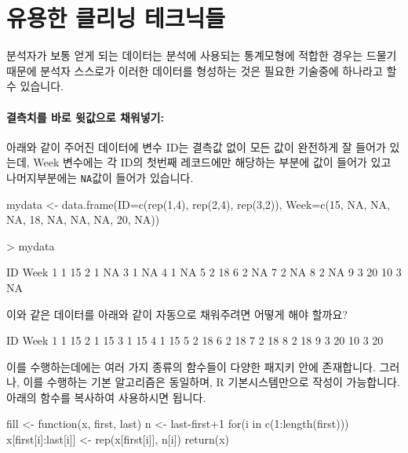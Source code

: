 \documentclass{report}
\begin{document}
\section{유용한 클리닝 테크닉들}

분석자가 보통 얻게 되는 데이터는 분석에 사용되는 통계모형에 적합한 경우는 드물기 때문에 분석자 스스로가 이러한 데이터를 형성하는 것은 필요한 기술중에 하나라고 할 수 있습니다.
% 

\paragraph{결측치를 바로 윗값으로 채워넣기: } 아래와 같이 주어진 데이터에 변수 ID는 결측값 없이 모든 값이 완전하게 잘 들어가 있는데, Week 변수에는 각 ID의 첫번째 레코드에만 해당하는 부분에 값이 들어가 있고 나머지부분에는 \texttt{NA}값이 들어가 있습니다. 

\begin{Schunk}
\begin{Soutput}
mydata <- data.frame(ID=c(rep(1,4), rep(2,4), rep(3,2)), Week=c(15, NA, NA, NA, 18, NA, NA, NA, 20, NA))

> mydata		

   ID Week
1   1   15
2   1   NA
3   1   NA
4   1   NA
5   2   18
6   2   NA
7   2   NA
8   2   NA
9   3   20
10  3   NA
\end{Soutput}
\end{Schunk}

이와 같은 데이터를 아래와 같이 자동으로 채워주려면 어떻게 해야 할까요? 	
	
\begin{Schunk}
\begin{Soutput}
   ID Week
1   1   15
2   1   15
3   1   15
4   1   15
5   2   18
6   2   18
7   2   18
8   2   18
9   3   20
10  3   20
\end{Soutput}
\end{Schunk}
	

이를 수행하는데에는 여러 가지 종류의 함수들이 다양한 패지키 안에 존재합니다.  
그러나, 이를 수행하는 기본 알고리즘은 동일하며, R 기본시스템만으로 작성이 가능합니다. 
아래의 함수를 복사하여 사용하시면 됩니다. 

\begin{Schunk}
	\begin{Soutput}
fill <- function(x, first, last){
	n <- last-first+1
	for(i in c(1:length(first))) x[first[i]:last[i]] <- rep(x[first[i]], n[i])
	return(x)
}
	\end{Soutput}
\end{Schunk}
\end{document}
